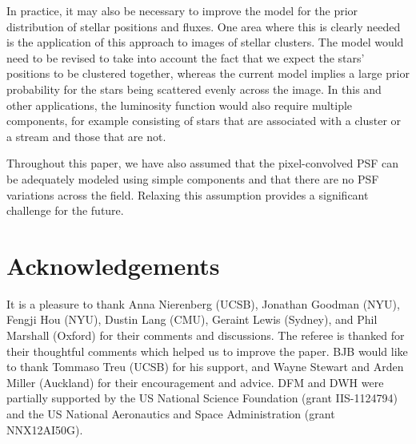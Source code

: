 \documentclass[12pt, preprint]{aastex}
\begin{document}
In practice, it may also be necessary to improve the model for the prior
distribution
of stellar positions and fluxes. One area where this is clearly needed is the
application of this approach to images of stellar clusters. The model would need
to be revised to take into account the fact that we expect the stars' positions
to be clustered together, whereas the current model implies a large prior
probability for the stars being scattered evenly across the image. In this and
other applications, the luminosity function would also require multiple
components, for example consisting of stars that are associated with a cluster
or a stream and those that are not.

Throughout this paper, we have also assumed that the pixel-convolved PSF can
be adequately modeled using simple components and that there are no PSF
variations across the field. Relaxing this assumption provides a significant
challenge for the future.



\section{Acknowledgements}
It is a pleasure to thank
  Anna Nierenberg (UCSB),
  Jonathan Goodman (NYU),
  Fengji Hou (NYU),
  Dustin Lang (CMU),
  Geraint Lewis (Sydney), and
  Phil Marshall (Oxford)
for their comments and discussions.
The referee is thanked for their thoughtful comments which helped us to improve
the paper.
BJB would like to thank Tommaso Treu (UCSB) for his support, and
Wayne Stewart and Arden Miller (Auckland) for their encouragement and advice.
DFM and DWH were partially supported by
   the US National Science Foundation (grant IIS-1124794) and
   the US National Aeronautics and Space Administration (grant NNX12AI50G).
\end{document}
